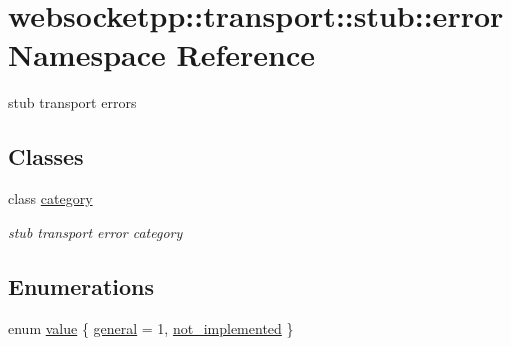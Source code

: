 \hypertarget{namespacewebsocketpp_1_1transport_1_1stub_1_1error}{}\section{websocketpp\+:\+:transport\+:\+:stub\+:\+:error Namespace Reference}
\label{namespacewebsocketpp_1_1transport_1_1stub_1_1error}


stub transport errors  


\subsection*{Classes}
\begin{DoxyCompactItemize}
\item 
class \hyperlink{classwebsocketpp_1_1transport_1_1stub_1_1error_1_1category}{category}
\begin{DoxyCompactList}\small\item\em stub transport error category \end{DoxyCompactList}\end{DoxyCompactItemize}
\subsection*{Enumerations}
\begin{DoxyCompactItemize}
\item 
enum \hyperlink{namespacewebsocketpp_1_1transport_1_1stub_1_1error_abff42d9e608f90864af8d628f6932022}{value} \{ \hyperlink{namespacewebsocketpp_1_1transport_1_1stub_1_1error_abff42d9e608f90864af8d628f6932022a62b9c9a1d537b94775fc8a8db6ff942e}{general} = 1, 
\hyperlink{namespacewebsocketpp_1_1transport_1_1stub_1_1error_abff42d9e608f90864af8d628f6932022ac4e3eebdd5ac574285cde2df484f0aae}{not\+\_\+implemented}
 \}
\end{DoxyCompactItemize}
